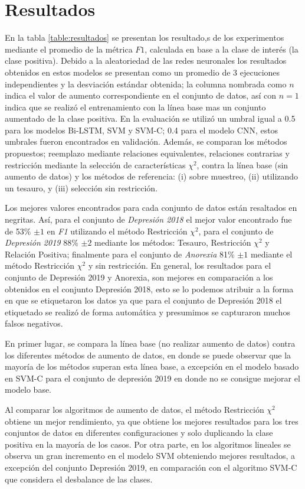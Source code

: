 \section{Resultados}

En la tabla \ref{table:resultados} se presentan los resultado,s de los experimentos mediante el promedio  de la métrica $F1$, calculada en base a la clase de interés (la clase positiva). Debido a la aleatoriedad de las redes neuronales los resultados obtenidos en estos modelos se presentan como un promedio de 3 ejecuciones independientes y la desviación estándar obtenida; la columna nombrada como $n$ indica el valor de aumento correspondiente en el conjunto de datos, así con $n=1$ indica que se realizó el entrenamiento con la línea base mas un conjunto aumentado de la clase positiva. En la evaluación se utilizó un umbral igual a 0.5 para los modelos Bi-LSTM, SVM y SVM-C; 0.4 para el modelo CNN, estos umbrales fueron encontrados en validación. Además, se comparan los métodos propuestos; reemplazo mediante relaciones equivalentes, relaciones contrarias y restricción mediante la selección de características $\chi^2$, contra la línea base (sin aumento de datos) y los métodos de referencia: (i) sobre muestreo, (ii) utilizando un tesauro, y (iii)  selección sin restricción.

Los mejores valores encontrados para cada conjunto de datos están resaltados en negritas. Así, para el conjunto de \textit{Depresión 2018} el mejor valor encontrado fue de 53\% $\pm 1$  en \textit{F1} utilizando el método Restricción $\chi^2$, para el conjunto de \textit{Depresión 2019} 88\% $\pm 2$ mediante los métodos: Tesauro, Restricción $\chi^2$ y Relación Positiva; finalmente para el conjunto de \textit{Anorexia} 81\% $\pm 1$ mediante el método Restricción $\chi^2$ y sin restricción. En general, los resultados para el conjunto de Depresión 2019 y Anorexia, son mejores en comparación a los obtenidos en el conjunto Depresión 2018, esto se lo podemos atribuir a la forma en que se etiquetaron los datos ya que para el conjunto de Depresión 2018 el etiquetado se realizó de forma automática y presumimos se capturaron muchos falsos negativos.

En primer lugar, se compara la línea base (no realizar aumento de datos) contra los diferentes métodos de aumento de datos, en donde se puede observar que la mayoría de los métodos superan esta línea base, a excepción en el modelo basado en SVM-C para el conjunto de depresión 2019 en donde no se consigue mejorar el modelo base. 

Al comparar los algoritmos de aumento de datos, el método Restricción $\chi^2$ obtiene un mejor rendimiento, ya que obtiene los mejores resultados para los tres conjuntos de datos en diferentes configuraciones y solo duplicando la clase positiva en la mayoría de los casos. Por otra parte, en los algoritmos lineales se observa un gran incremento en el modelo SVM obteniendo mejores resultados, a excepción del conjunto Depresión 2019, en comparación con el algoritmo SVM-C que considera el desbalance de las clases. 






